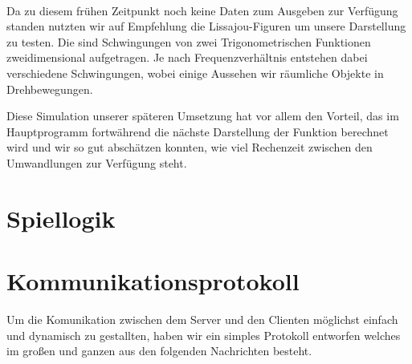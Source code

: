 \paragraph*{}
Da zu diesem frühen Zeitpunkt noch keine Daten zum Ausgeben zur Verfügung standen nutzten wir auf Empfehlung die Lissajou-Figuren um unsere Darstellung zu testen. Die sind Schwingungen von zwei Trigonometrischen Funktionen zweidimensional aufgetragen. Je nach Frequenzverhältnis entstehen dabei verschiedene Schwingungen, wobei einige Aussehen wir räumliche Objekte in Drehbewegungen. 



Diese Simulation unserer späteren Umsetzung hat vor allem den Vorteil, das im Hauptprogramm fortwährend die nächste Darstellung der Funktion berechnet wird und wir so gut abschätzen konnten, wie viel Rechenzeit zwischen den Umwandlungen zur Verfügung steht.

\section*{Spiellogik}

\section*{Kommunikationsprotokoll}

\paragraoh*{}
Um die Komunikation zwischen dem Server und den Clienten möglichst einfach und dynamisch zu gestallten, haben wir ein simples Protokoll entworfen welches im großen und ganzen aus den folgenden Nachrichten besteht.

